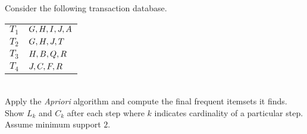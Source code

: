 



\question[5] Consider the following transaction database.
\\
\begin{tabular}{ll}
  \textbf{$T_1$} & $G,H,I,J,A$ \nonumber \\
  \textbf{$T_2$} & $G,H,J,T$ \nonumber \\
  \textbf{$T_3$} & $H,B,Q,R$ \nonumber \\
  \textbf{$T_4$} & $J,C,F,R$ \nonumber
\end{tabular}
\\
Apply the \textit{Apriori} algorithm and compute the final frequent
itemsets it finds. Show $L_k$ and $C_k$ after each step where $k$ 
indicates cardinality of a particular step. Assume minimum support $2$.

\watchout

